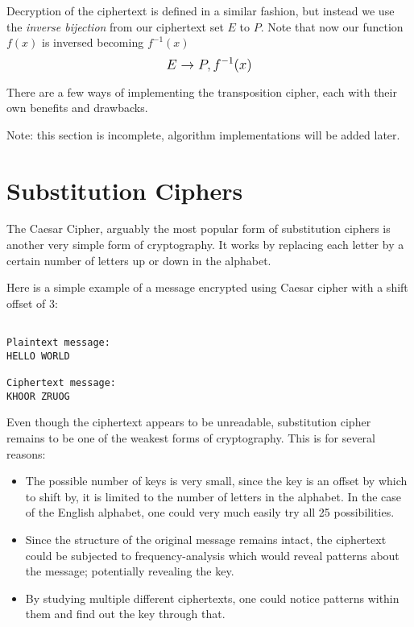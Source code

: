 Decryption of the ciphertext is defined in a similar fashion, but instead we use the \textit{inverse bijection} from our ciphertext set $E$ to $P$. 
Note that now our function $f(x)$ is inversed becoming $f^{-1}(x)$ $$\mathlarger{E \rightarrow P, f^{-1}(x)}$$

There are a few ways of implementing the transposition cipher, each with their own benefits and drawbacks. 

Note: this section is incomplete, algorithm implementations will be added later.

\section{Substitution Ciphers}

The Caesar Cipher, arguably the most popular form of substitution ciphers is another very simple form of cryptography. 
It works by replacing each letter by a certain number of letters up or down in the alphabet. 

Here is a simple example of a message encrypted using Caesar cipher with a shift offset of 3:

\begin{verbatim}

Plaintext message: 
HELLO WORLD
               
Ciphertext message:
KHOOR ZRUOG
\end{verbatim}

Even though the ciphertext appears to be unreadable, substitution cipher remains to be one of the weakest forms of cryptography. 
This is for several reasons:
\begin{itemize}  
    \item The possible number of keys is very small, since the key is an offset by which to shift by, it is limited to the number of letters in the alphabet.
    In the case of the English alphabet, one could very much easily try all 25 possibilities. 
    \item Since the structure of the original message remains intact, the ciphertext could be subjected to frequency-analysis which would reveal patterns about the message;
    potentially revealing the key.
    \item By studying multiple different ciphertexts, one could notice patterns within them and find out the key through that.
\end{itemize}

